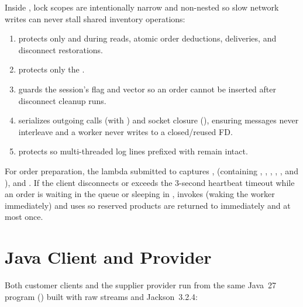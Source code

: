 \documentclass{../latex/utmreport}
\begin{document}
Inside , lock scopes are intentionally narrow and non-nested so slow network writes can never stall shared inventory operations:
\begin{enumerate}
  \item {} protects only  and  during reads, atomic order deductions, deliveries, and disconnect restorations.
  \item {} protects only the  .
  \item {} guards the session's  flag and  vector so an order cannot be inserted after disconnect cleanup runs.
  \item {} serializes outgoing  calls (with ) and socket closure (), ensuring messages never interleave and a worker never writes to a closed/reused FD.
  \item {} protects  so multi-threaded log lines prefixed with \code{[ip:port]} remain intact.
\end{enumerate}

For order preparation, the lambda submitted to  captures ,  (containing , , , , , and ), and . If the client disconnects or exceeds the 3-second heartbeat timeout while an order is waiting in the queue or sleeping in ,  invokes  (waking the worker immediately) and uses  so reserved products are returned to  immediately and at most once.

\section{Java Client and Provider}
Both customer clients and the supplier provider run from the same Java~27 program () built with raw  streams and Jackson~3.2.4:
\end{document}
